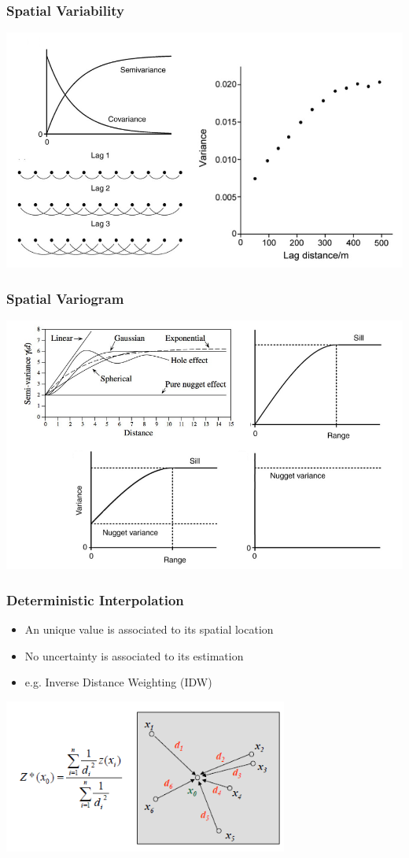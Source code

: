 \documentclass{beamer}
\begin{document}
\begin{frame}
\frametitle{Spatial Variability}
\centering
\includegraphics[width=\textwidth]{Figures/vario1.png}
\end{frame}


\begin{frame}
\frametitle{Spatial Variogram}
\centering
\includegraphics[width=\textwidth]{Figures/variogram.png}
\end{frame}


\begin{frame}
\frametitle{Deterministic Interpolation}
\begin{itemize}
\item An unique value is associated to its spatial location
\item No uncertainty is associated to its estimation
\item \alert{e.g. Inverse Distance Weighting (IDW)}
\end{itemize}
\includegraphics[width=0.7\textwidth]{Figures/idw.png}
\end{frame}
\end{document}
